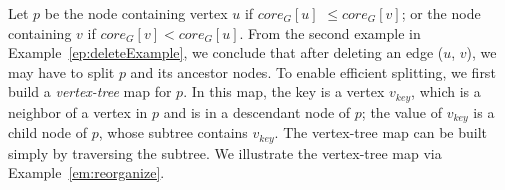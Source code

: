 Let $p$ be the node containing vertex $u$ if $core_G[u]$ $\le$$core_G[v]$;
or the node containing $v$ if $core_G[v]$$<$$core_G[u]$.
From the second example in Example~\ref{ep:deleteExample}, we conclude that after deleting an edge ($u$, $v$),
we may have to split $p$ and its ancestor nodes.
To enable efficient splitting, we first build a \emph{vertex-tree} map for $p$.
In this map, the key is a vertex $v_{key}$,
which is a neighbor of a vertex in $p$ and is in a descendant node of $p$;
the value of $v_{key}$ is a child node of $p$, whose subtree contains $v_{key}$.
The vertex-tree map can be built simply by traversing the subtree.
We illustrate the vertex-tree map via Example~\ref{em:reorganize}.



